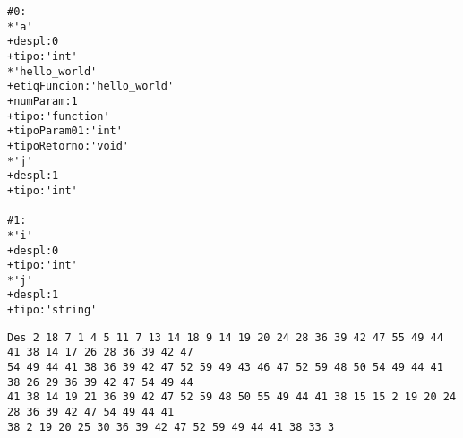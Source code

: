\begin{enumerate}
    \begin{tcolorbox}[title={Volcado del fichero de la tabla de símbolos}, colback=white]
        \begin{lstlisting}
#0:
*'a'
+despl:0
+tipo:'int'
*'hello_world'
+etiqFuncion:'hello_world'
+numParam:1
+tipo:'function'
+tipoParam01:'int'
+tipoRetorno:'void'
*'j'
+despl:1
+tipo:'int'

#1:
*'i'
+despl:0
+tipo:'int'
*'j'
+despl:1
+tipo:'string'
        \end{lstlisting}
    \end{tcolorbox}

    \begin{tcolorbox}[title={Volcado del parse}, colback=white]
        \begin{lstlisting}
Des 2 18 7 1 4 5 11 7 13 14 18 9 14 19 20 24 28 36 39 42 47 55 49 44 41 38 14 17 26 28 36 39 42 47
54 49 44 41 38 36 39 42 47 52 59 49 43 46 47 52 59 48 50 54 49 44 41 38 26 29 36 39 42 47 54 49 44
41 38 14 19 21 36 39 42 47 52 59 48 50 55 49 44 41 38 15 15 2 19 20 24 28 36 39 42 47 54 49 44 41
38 2 19 20 25 30 36 39 42 47 52 59 49 44 41 38 33 3
        \end{lstlisting}
    \end{tcolorbox}


\end{enumerate}

